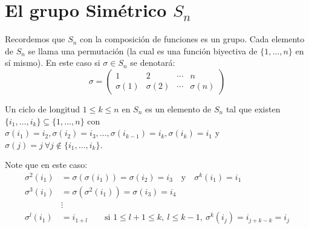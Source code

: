\section{El grupo Simétrico \texorpdfstring{$S_n$}{Sn}}
\label{sec:Grupo_Simetrico}

Recordemos que $S_n$ con la composición de funciones es un grupo. Cada elemento de $S_n$ se llama una permutación (la cual es una función biyectiva de $\{1, \dots, n\}$ en sí mismo). En este caso si $\sigma \in S_n$ se denotará:
\begin{equation*}
    \sigma = \begin{pmatrix} 1 & 2 & \cdots & n \\ \sigma(1) & \sigma(2) & \cdots & \sigma(n) \end{pmatrix}
\end{equation*}

\begin{defi}
    Un ciclo de longitud $1 \leq k \leq n$ en $S_n$ es un elemento de $S_n$ tal que existen $\{i_1, \dots, i_k\} \subseteq \{1, \dots, n\}$ con $\sigma(i_1) = i_2, \sigma(i_2) = i_3, \dots, \sigma(i_{k-1}) = i_k, \sigma(i_k) = i_1$ y $\sigma(j) = j \ \forall j \notin \{i_1, \dots, i_k\}$.
\end{defi}

\begin{center}
\end{center}

Note que en este caso:
\begin{equation*}
\begin{aligned}
    \sigma^2(i_1) &= \sigma(\sigma(i_1)) = \sigma(i_2) = i_3 \quad \text{y} \quad \sigma^k(i_1) = i_1 \\
    \sigma^3(i_1) &= \sigma(\sigma^2(i_1)) = \sigma(i_3) = i_4 \\
    &\vdots \\
    \sigma^l(i_1) &= i_{1+l} \qquad \text{si } 1 \leq l+1 \leq k, \ l \leq k-1, \ \sigma^k(i_j) = i_{j+k-k} = i_j
\end{aligned}
\end{equation*}

